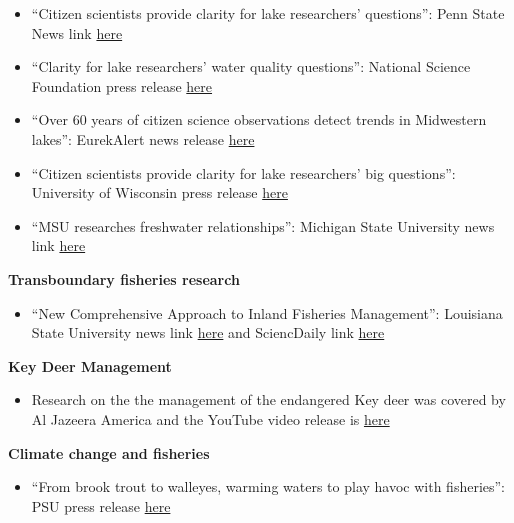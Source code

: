 \documentclass[10pt]{article}
\begin{document}
\begin{flushleft}
\begin{itemize}
\item ``Citizen scientists provide clarity for lake researchers' questions'': Penn State News link
\href{http://news.psu.edu/story/314178/2014/04/30/research/citizen-scientists-provide-clarity-lake-researchers-questions}{here} \\
\item ``Clarity for lake researchers' water quality questions'': National Science Foundation press release
\href{http://www.nsf.gov/discoveries/disc_summ.jsp?cntn_id=131238&org=NSF&from=news}{here} \\
\item ``Over 60 years of citizen science observations detect trends in Midwestern lakes'': EurekAlert news release
\href{http://www.eurekalert.org/pub_releases/2014-04/p-o6y042814.php}{here} \\
\item ``Citizen scientists provide clarity for lake researchers’ big questions'': University of Wisconsin press release
\href{http://www.news.wisc.edu/22805}{here}  \\
\item ``MSU researches freshwater relationships'': Michigan State University news link \href{http://www.statenews.com/index.php/article/2010/06/msu_researches_freshwater_relationships}{here}\\
\vspace{5pt}
\end{itemize}
\textbf{Transboundary fisheries research}\\
\begin{itemize}
\item ``New Comprehensive Approach to Inland Fisheries Management'': Louisiana State University news link \href{http://www.lsu.edu/mediacenter/news/2016/09/13docs_midway_transfish.php}{here} and SciencDaily link \href{https://www.sciencedaily.com/releases/2016/09/160914130706.htm}{here}\\
\end{itemize}
\textbf{Key Deer Management}\\
\begin{itemize}
\vspace{5pt}
\item Research on the the management of the endangered Key deer was covered by Al Jazeera America and the YouTube video release is \href{http://www.youtube.com/watch?v=r6GX7tZiPFk}{here}\\
\vspace{5pt}
\end{itemize}
\textbf{Climate change and fisheries}\\
\begin{itemize}
\vspace{5pt}
\item ``From brook trout to walleyes, warming waters to play havoc with fisheries'': PSU press release \href{http://news.psu.edu/story/470451/2017/06/04/research/brook-trout-walleyes-warming-waters-play-havoc-fisheries}{here}\\
\vspace{5pt}
\end{itemize}


\end{flushleft}
\end{document}
